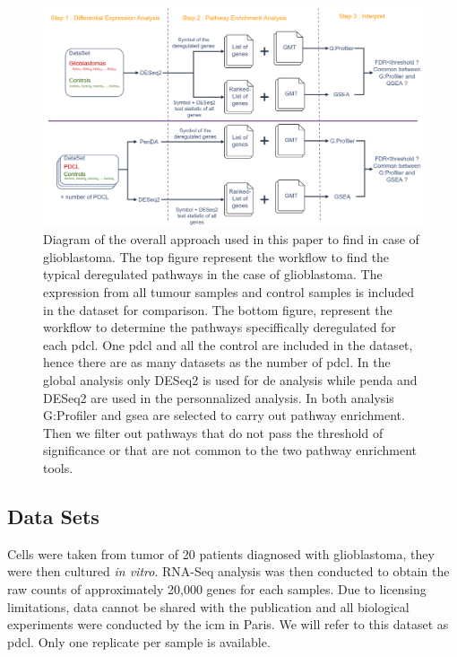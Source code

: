 \begin{figure}
    \centering
    \includegraphics[width=\textwidth]{img/workflow-diagram}
    \caption{
        Diagram of the overall approach used in this paper to find in case of glioblastoma.
        The top figure represent the workflow to find the typical deregulated pathways in the case of glioblastoma.
        The expression from all tumour samples and control samples is included in the dataset for comparison.
        The bottom figure, represent the workflow to determine the pathways speciffically deregulated for each \acrshort{pdcl}.
        One \acrshort{pdcl} and all the control are included in the dataset, hence there are as many datasets as the number of \acrshort{pdcl}.
        In the global analysis only DESeq2 is used for \acrlong{de} analysis while \acrshort{penda} and DESeq2 are used in the personnalized analysis.
        In both analysis G:Profiler and \acrshort{gsea} are selected to carry out pathway enrichment.
        Then we filter out pathways that do not pass the threshold of significance or that are not common to the two pathway enrichment tools.
    }
    \label{fig:workflow-diagram-global}
\end{figure}

\subsection{Data Sets}

Cells were taken from tumor of 20 patients diagnosed with glioblastoma, they were  then cultured \textit{in vitro}.
RNA-Seq analysis was then conducted to obtain the raw counts of approximately 20,000 genes for each samples.
Due to licensing limitations, data cannot be shared with the publication and all biological experiments were conducted by the \acrfull{icm} in Paris.
We will refer to this dataset as \acrfull{pdcl}.
Only one replicate per sample is available.

